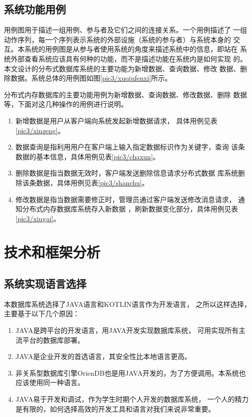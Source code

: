 \subsection{系统功能用例}
用例图用于描述一组用例、参与者及它们之间的连接关系。一个用例描述了
一组动作序列，每一个序列表示系统的外部设施（系统的参与者）与系统本身的
交互。本系统的用例图是从参与者使用系统的角度来描述系统中的信息，即站在
系统外部查看系统应该具有何种的功能，而不是描述功能在系统内是如何实现
的。本文设计的分布式数据库系统的主要功能为新增数据、查询数据、修改
数据、删除数据。系统总体的用例图如图\ref{pic3/xuqiufenxi}所示。

分布式内存数据库的主要功能用例为新增数据、查询数据、修改数据、删除
数据等，下面对这几种操作的用例进行说明。
\begin{enumerate}[fullwidth,itemindent=2em,listparindent=2em]
	\item 新增数据是用户从客户端向系统发起新增数据请求，
	具体用例见表\ref{pic3/xinzeng}。
	\item 数据查询是指利用用户在客户端上输入指定数据标识作为关键字，查询
	该条数据的基本信息，具体用例见表\ref{pic3/chaxun}。
\item 	删除数据是指当数据无效时，客户端发送删除信息请求分布式数据
	库系统删除该条数据，具体用例见表\ref{pic3/shanchu}。
\item 	修改数据是指当数据需要修正时，管理员通过客户端发送修改消息请求，
	通知分布式内存数据库系统存入新数据
	，刷新数据变化部分，具体用例见表\ref{pic3/xiugai}。
\end{enumerate}
\section{技术和框架分析}
\subsection{系统实现语言选择}
本数据库系统选择了JAVA语言和KOTLIN语言作为开发语言，
之所以这样选择，主要基于以下几个原因：
\begin{enumerate}[fullwidth,itemindent=2em,listparindent=2em]
	\item JAVA是跨平台的开发语言，用JAVA开发实现数据库系统，
	可用实现所有主流平台的数据库部署。
	\item JAVA是企业开发的首选语言，其安全性比本地语言更高。
	\item 非关系型数据库引擎OrienDB也是用JAVA开发的，为了方便调用。本系统也应该使用同一种语言。
	\item JAVA易于开发和调试，作为学生时期个人开发的数据库系统，
	一个人的精力是有限的，如何选择高效的开发工具和语言对我们来说非常重要。
\end{enumerate}
